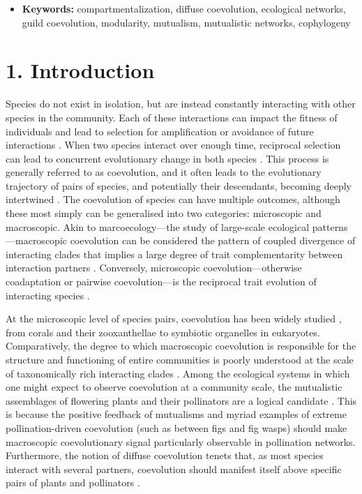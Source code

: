 \documentclass{article}
\begin{document}
\begin{itemize}
\item {\bfseries Keywords:} compartmentalization, diffuse coevolution, ecological networks, guild coevolution, modularity, mutualism, mutualistic networks, cophylogeny
\end{itemize}

\clearpage
\citeindextrue

\section*{1. Introduction}

	Species do not exist in isolation, but are instead constantly interacting with other species in the community. Each of these interactions can impact the fitness of individuals and lead to selection for amplification or avoidance of future interactions \citep{Thompson2005, Futuyma2009}. When two species interact over enough time, reciprocal selection can lead to concurrent evolutionary change in both species \citep{Thompson2005}. This process is generally referred to as coevolution, and it often leads to the evolutionary trajectory of pairs of species, and potentially their descendants, becoming deeply intertwined \citep{Thompson2005}. The coevolution of species can have multiple outcomes, although these most simply can be generalised into two categories: microscopic and macroscopic. Akin to marcoecology---the study of large-scale ecological patterns---macroscopic coevolution can be considered the pattern of coupled divergence of interacting clades that implies a large degree of trait complementarity between interaction partners \citep{Futuyma1983, Brooks1993, Segraves2010}. Conversely, microscopic coevolution---otherwise coadaptation or pairwise coevolution---is the reciprocal trait evolution of interacting species \citep{Janzen1980, Thompson2005}. 
	
	At the microscopic level of species pairs, coevolution has been widely studied \citep{Thompson2005, Futuyma2009}, from corals and their zooxanthellae to symbiotic organelles in eukaryotes. Comparatively, the degree to which macroscopic coevolution is responsible for the structure and functioning of entire communities is poorly understood at the scale of taxonomically rich interacting clades \citep{Thompson2005, Bascompte2014}. Among the ecological systems in which one might expect to observe coevolution at a community scale, the mutualistic assemblages of flowering plants and their pollinators are a logical candidate \citep{Olesen2007, Bascompte2007}. This is because the positive feedback of mutualisms  \citep{Bascompte2007} and myriad examples of extreme pollination-driven coevolution (such as between figs and fig wasps) should make macroscopic coevolutionary signal particularly observable in pollination networks. Furthermore, the notion of diffuse coevolution tenets that, as most species interact with several partners, coevolution should manifest itself above specific pairs of plants and pollinators \citep{Janzen1980, Fox1988, Thompson2005, Nuismer2013}.
	
\end{document}
